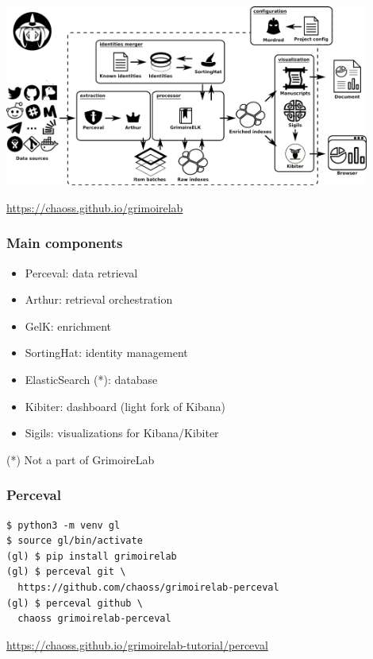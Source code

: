 \documentclass[17pt,aspectratio=169,hyperref=pdfusetitle]{beamer}
\begin{document}
\begin{frame}

\begin{center}
  \includegraphics[width=12cm]{figs/grimoirelab-arquitecture}
\end{center}

\begin{flushright}
  \url{https://chaoss.github.io/grimoirelab}
\end{flushright}
\end{frame}


\begin{frame}
\frametitle{Main components}

  \begin{itemize}
  \item Perceval: data retrieval
  \item Arthur: retrieval orchestration
  \item GelK: enrichment
  \item SortingHat: identity management
  \item ElasticSearch (*): database
  \item Kibiter: dashboard (light fork of Kibana)
  \item Sigils: visualizations for Kibana/Kibiter
  \end{itemize}

  (*) Not a part of GrimoireLab

\end{frame}


\begin{frame}[fragile]
\frametitle{Perceval}

{\small
\begin{verbatim}
$ python3 -m venv gl
$ source gl/bin/activate
(gl) $ pip install grimoirelab
(gl) $ perceval git \
  https://github.com/chaoss/grimoirelab-perceval
(gl) $ perceval github \
  chaoss grimoirelab-perceval
\end{verbatim}
}

\vspace{1cm}
{\footnotesize
\begin{flushright}
  \href{chaoss.github.io/grimoirelab-tutorial/perceval}{https://chaoss.github.io/grimoirelab-tutorial/perceval}
\end{flushright}
}
\end{frame}
\end{document}
